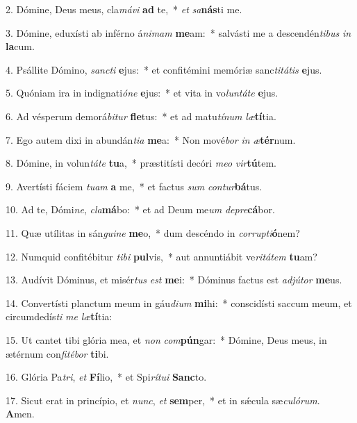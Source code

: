 2. Dómine, Deus meus, cla\textit{má}\textit{vi} \textbf{ad} te,~*  \textit{et} \textit{sa}\textbf{nás}ti me.\

3. Dómine, eduxísti ab inférno á\textit{ni}\textit{mam} \textbf{me}am:~*  salvásti me a descendén\textit{ti}\textit{bus} \textit{in} \textbf{la}cum.\

4. Psállite Dómino, \textit{sanc}\textit{ti} \textbf{e}jus:~*  et confitémini memóriæ sanc\textit{ti}\textit{tá}\textit{tis} \textbf{e}jus.\

5. Quóniam ira in indignati\textit{ó}\textit{ne} \textbf{e}jus:~*  et vita in vo\textit{lun}\textit{tá}\textit{te} \textbf{e}jus.\

6. Ad vésperum demorá\textit{bi}\textit{tur} \textbf{fle}tus:~*  et ad matu\textit{tí}\textit{num} \textit{læ}\textbf{tí}tia.\

7. Ego autem dixi in abundán\textit{ti}\textit{a} \textbf{me}a:~*  Non mové\textit{bor} \textit{in} \textit{æ}\textbf{tér}num.\

8. Dómine, in volun\textit{tá}\textit{te} \textbf{tu}a,~*  præstitísti decóri \textit{me}\textit{o} \textit{vir}\textbf{tú}tem.\

9. Avertísti fáciem \textit{tu}\textit{am} \textbf{a} me,~*  et factus \textit{sum} \textit{con}\textit{tur}\textbf{bá}tus.\

10. Ad te, Dómi\textit{ne}, \textit{cla}\textbf{má}bo:~*  et ad Deum me\textit{um} \textit{de}\textit{pre}\textbf{cá}bor.\

11. Quæ utílitas in sán\textit{gui}\textit{ne} \textbf{me}o,~*  dum descéndo in \textit{cor}\textit{rup}\textit{ti}\textbf{ó}nem?\

12. Numquid confitébitur \textit{ti}\textit{bi} \textbf{pul}vis,~*  aut annuntiábit ve\textit{ri}\textit{tá}\textit{tem} \textbf{tu}am?\

13. Audívit Dóminus, et misér\textit{tus} \textit{est} \textbf{me}i:~*  Dóminus factus est \textit{ad}\textit{jú}\textit{tor} \textbf{me}us.\

14. Convertísti planctum meum in gáu\textit{di}\textit{um} \textbf{mi}hi:~*  conscidísti saccum meum, et circumdedís\textit{ti} \textit{me} \textit{læ}\textbf{tí}tia:\

15. Ut cantet tibi glória mea, et \textit{non} \textit{com}\textbf{pún}gar:~*  Dómine, Deus meus, in ætérnum con\textit{fi}\textit{té}\textit{bor} \textbf{ti}bi.\

16. Glória Pa\textit{tri}, \textit{et} \textbf{Fí}lio,~*  et Spi\textit{rí}\textit{tu}\textit{i} \textbf{Sanc}to.\

17. Sicut erat in princípio, et \textit{nunc}, \textit{et} \textbf{sem}per,~*  et in sǽcula sæ\textit{cu}\textit{ló}\textit{rum}. \textbf{A}men.\

